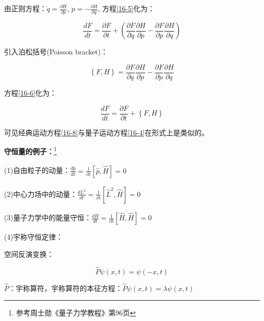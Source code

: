 由正则方程：$\dot q = \frac{{\partial H}}{{\partial p}}$, $\dot p =  - \frac{{\partial H}}{{\partial q}}$, 方程\ref{16-5}化为：

\begin{equation}\label{16-6}
\frac{{dF}}{{dt}} = \frac{{\partial F}}{{\partial t}} + \left( {\frac{{\partial F}}{{\partial q}}\frac{{\partial H}}{{\partial p}} - \frac{{\partial F}}{{\partial p}}\frac{{\partial H}}{{\partial q}}} \right)
\end{equation}

引入泊松括号(Poisson bracket)：


\begin{equation}\label{16-7}
\left\{ {F,H} \right\} = \frac{{\partial F}}{{\partial q}}\frac{{\partial H}}{{\partial p}} - \frac{{\partial F}}{{\partial p}}\frac{{\partial H}}{{\partial q}}
\end{equation}

方程\ref{16-6}化为：

\begin{equation}\label{16-8}
\frac{{dF}}{{dt}} = \frac{{\partial F}}{{\partial t}} + \left\{ {F,H} \right\}
\end{equation}

可见经典运动方程\ref{16-8}与量子运动方程\ref{16-4}在形式上是类似的。

\textbf{守恒量的例子：}\footnote{参考周士勋《量子力学教程》第96页}

(1)自由粒子的动量：$\frac{{d\overline p }}{{dt}} = \frac{1}{{i\hbar }}\overline {\left[ {\widehat p,\widehat H} \right]}  = 0$

(2)中心力场中的动量：$\frac{{d\overline {L^2 } }}{{dt}} = \frac{1}{{i\hbar }}\overline {\left[ {\widehat L^2 ,\widehat H} \right]}  = 0$

(3)量子力学中的能量守恒：$\frac{{d\overline H }}{{dt}} = \frac{1}{{i\hbar }}\overline {\left[ {\widehat H,\widehat H} \right]}  = 0$

(4)宇称守恒定律：

空间反演变换：


\begin{equation}\label{16-9}
\widehat P\psi \left( {x,t} \right) = \psi \left( { - x,t} \right)
\end{equation}

$\hat P$：宇称算符，宇称算符的本征方程：$\widehat P\psi \left( {x,t} \right) = \lambda \psi \left( {x,t} \right)$

